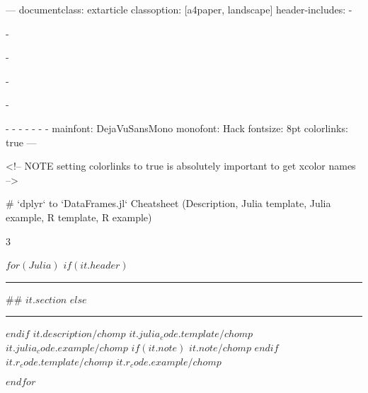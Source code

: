 ---
documentclass: extarticle
classoption: [a4paper, landscape]
header-includes:
  - \usepackage{graphicx}
  - \usepackage[lmargin=1cm,rmargin=1cm,tmargin=1.75cm,bmargin=1.5cm]{geometry}
  - \usepackage{multicol}
  - \usepackage{fvextra}
  - \usepackage{fancyhdr}
  - 
  - \setlength{\columnsep}{30pt}
  - \setlength{\columnseprule}{1pt}
  - \def\columnseprulecolor{\color{Green}}
  - \newcommand{\myRule}[3][black]{\textcolor{#1}{\rule{#2}{#3}}}
  - \let\Begin\begin
  - \let\End\end
mainfont: DejaVuSansMono
monofont: Hack
fontsize: 8pt
colorlinks: true
---

<!-- NOTE setting colorlinks to true is absolutely important to get xcolor names -->

\pagestyle{fancy}
\fancyhf[LH]{}
\fancyhf[RH]{}
\renewcommand{\headrulewidth}{1pt}
\renewcommand{\footrulewidth}{1pt}
\fancyhf[CF]{\thepage}

# `dplyr` to `DataFrames.jl` Cheatsheet \normalsize(Description, Julia template, Julia example, R template, R example)


\Begin{multicols}{3}

$for(Julia)$
$if(it.header)$
\myRule[Green]{\linewidth}{3pt}
\vspace{-20pt}
## $it.section$
$else$
\myRule[Purple]{\linewidth}{3pt}
$endif$ 
\small \textbf{$it.description/chomp$}
\normalsize
$it.julia_code.template/chomp$
\vspace{-5pt}
\small
$it.julia_code.example/chomp$
$if(it.note)$
\footnotesize \emph{$it.note/chomp$}
\small
$endif$
\smallskip
$it.r_code.template/chomp$
\vspace{-10pt}
$it.r_code.example/chomp$
\normalsize

\vspace{-3pt}

$endfor$

\End{multicols}
